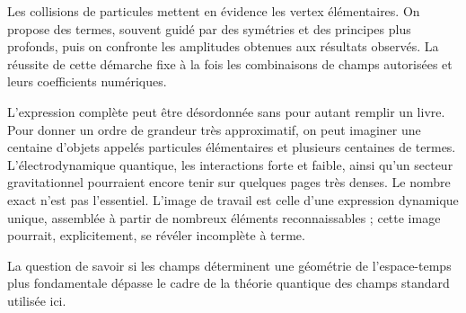 Les collisions de particules mettent en évidence les vertex élémentaires. On propose des termes, souvent guidé par des symétries et des principes plus profonds, puis on confronte les amplitudes obtenues aux résultats observés. La réussite de cette démarche fixe à la fois les combinaisons de champs autorisées et leurs coefficients numériques.

\begin{classroomqa}
\end{classroomqa}

L’expression complète peut être désordonnée sans pour autant remplir un livre. Pour donner un ordre de grandeur très approximatif, on peut imaginer une centaine d’objets appelés particules élémentaires et plusieurs centaines de termes. L’électrodynamique quantique, les interactions forte et faible, ainsi qu’un secteur gravitationnel pourraient encore tenir sur quelques pages très denses. Le nombre exact n’est pas l’essentiel. L’image de travail est celle d’une expression dynamique unique, assemblée à partir de nombreux éléments reconnaissables ; cette image pourrait, explicitement, se révéler incomplète à terme.

La question de savoir si les champs déterminent une géométrie de l’espace-temps plus fondamentale dépasse le cadre de la théorie quantique des champs standard utilisée ici.

\begin{classroomqa}
\end{classroomqa}


